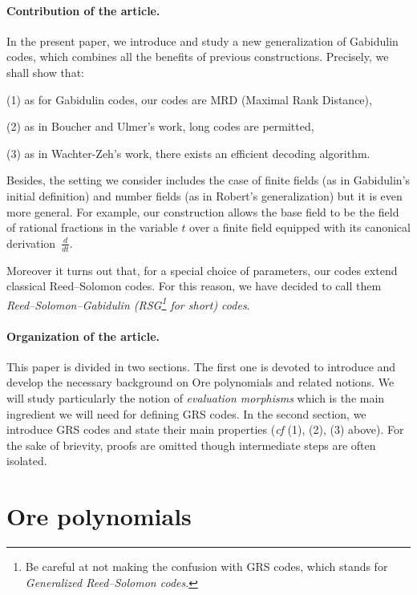 \documentclass[a4paper]{llncs}
\begin{document}
\paragraph{Contribution of the article.}

In the present paper, we introduce and study a new generalization 
of Gabidulin codes, which combines all the benefits of previous 
constructions. Precisely, we shall show that:

\noindent
(1) as for Gabidulin codes, our codes are MRD (Maximal Rank Distance),

\noindent
(2) as in Boucher and Ulmer's work, long codes are permitted,

\noindent
(3) as in Wachter-Zeh's work, there exists an efficient decoding algorithm.

\smallskip

\noindent 
Besides, the setting we consider includes the case of finite fields (as 
in Gabidulin's initial definition) and number fields (as in Robert's 
generalization) but it is even more general. 
For example, our construction allows the base field to be the field of 
rational fractions in the variable $t$ over a finite field equipped with 
its canonical derivation~$\frac d{dt}$.

Moreover it turns out that, for a special choice of parameters, our 
codes extend classical Reed--Solomon codes. For this reason, we have 
decided to call them \emph{Reed--Solomon--Gabidulin (RSG\footnote{Be 
careful at not making the confusion with GRS codes, which stands for 
\emph{Generalized Reed--Solomon codes}.} for short) codes}.

\paragraph{Organization of the article.}

This paper is divided in two sections. 
The first one is devoted to introduce and develop the necessary 
background on Ore polynomials and related notions. We will study
particularly the notion of \emph{evaluation morphisms} which is 
the main ingredient we will need for defining GRS codes.
In the second section, we introduce GRS codes and state their main 
properties (\emph{cf} (1), (2), (3) above). For the sake of brievity, 
proofs are omitted though intermediate steps are often isolated.

\section{Ore polynomials}
\end{document}
